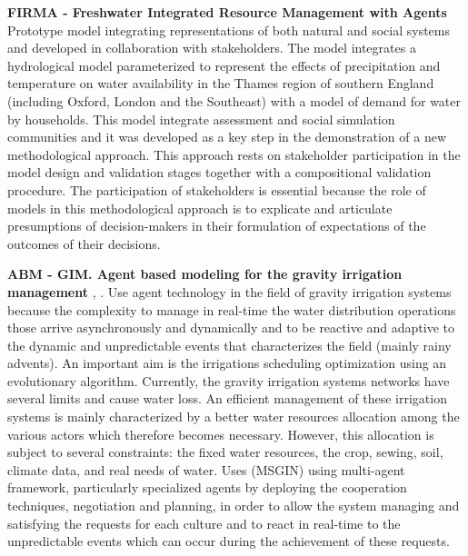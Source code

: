 \documentclass[letterpaper, 10 pt, conference]{ieeeconf}  %
\begin{document}
\textbf{FIRMA - Freshwater Integrated Resource Management with Agents} \cite{Moss2000} Prototype  model integrating  representations  of  both  natural  and  social  systems  and  developed  in collaboration  with  stakeholders. The  model  integrates  a  hydrological  model 
parameterized  to  represent  the  effects  of  precipitation  and  temperature  on  water availability in the Thames region of southern England (including Oxford, London and the Southeast) with a model of demand for water by households. This model integrate assessment and social simulation communities and it was developed as a key step in the demonstration of a new methodological approach.  This approach rests on stakeholder participation in the model design and validation stages together with a compositional validation procedure.  The participation of stakeholders is essential because the role of models in this methodological approach is to explicate and articulate presumptions of decision-makers in their formulation of expectations of the outcomes of their decisions.    


\textbf{ABM - GIM. Agent based modeling for the gravity irrigation management} \cite{Belaqziz2011}, \cite{Belaqziz2013}. Use agent technology in the field of gravity  irrigation  systems because  the  complexity  to  manage  in  real-time  the  water  distribution  operations  those  arrive asynchronously  and  dynamically  and  to  be  reactive  and  adaptive  to  the  dynamic  and  unpredictable  events  that characterizes  the  field  (mainly  rainy  advents).  An important aim is the irrigations  scheduling  optimization  using  an  evolutionary  algorithm. Currently, the gravity irrigation systems networks have several limits and cause water loss. An efficient management of these irrigation systems is mainly characterized by a better water resources allocation among the various actors which therefore becomes necessary. However, this allocation is subject to several constraints: the fixed water resources, the crop, sewing, soil, climate data, and real needs of water. Uses (MSGIN) using multi-agent framework, particularly specialized agents by deploying the cooperation techniques, negotiation and planning, in order to allow the system managing and satisfying the requests for each culture and to react in real-time to the unpredictable events which can occur during the achievement of these requests.  
\end{document}
